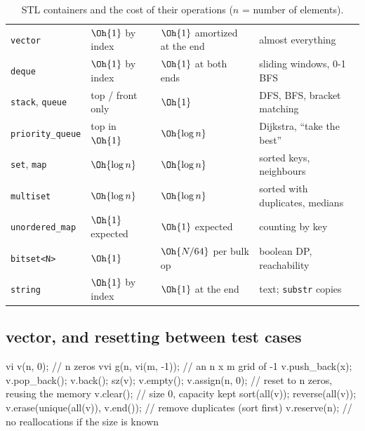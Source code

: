 \begin{table}[htbp]
\centering
\caption{STL containers and the cost of their operations ($n$ = number of elements).}\label{tab:containers}
\small
\begin{tabularx}{\linewidth}{P{3.1cm}P{2.9cm}P{3.3cm}L}
\toprule
{} &  &  &  \\
\midrule
\texttt{vector} & $\Oh{1}$ by index & $\Oh{1}$ amortized at the end & almost everything \\
\texttt{deque} & $\Oh{1}$ by index & $\Oh{1}$ at both ends & sliding windows, 0-1 BFS \\
\texttt{stack}, \texttt{queue} & top / front only & $\Oh{1}$ & DFS, BFS, bracket matching \\
\texttt{priority\_queue} & top in $\Oh{1}$ & $\Oh{\log n}$ & Dijkstra, ``take the best'' \\
\texttt{set}, \texttt{map} & $\Oh{\log n}$ & $\Oh{\log n}$ & sorted keys, neighbours \\
\texttt{multiset} & $\Oh{\log n}$ & $\Oh{\log n}$ & sorted with duplicates, medians \\
\texttt{unordered\_map} & $\Oh{1}$ expected & $\Oh{1}$ expected & counting by key \\
\texttt{bitset<N>} & $\Oh{1}$ & $\Oh{N/64}$ per bulk op & boolean DP, reachability \\
\texttt{string} & $\Oh{1}$ by index & $\Oh{1}$ at the end & text; \texttt{substr} copies \\
\bottomrule
\end{tabularx}
\end{table}

\subsection{vector, and resetting between test cases}

\begin{code}
vi v(n, 0);                            // n zeros
vvi g(n, vi(m, -1));                   // an n x m grid of -1
v.push_back(x); v.pop_back(); v.back(); sz(v); v.empty();
v.assign(n, 0);                        // reset to n zeros, reusing the memory
v.clear();                             // size 0, capacity kept
sort(all(v)); reverse(all(v));
v.erase(unique(all(v)), v.end());      // remove duplicates (sort first)
v.reserve(n);                          // no reallocations if the size is known
\end{code}

